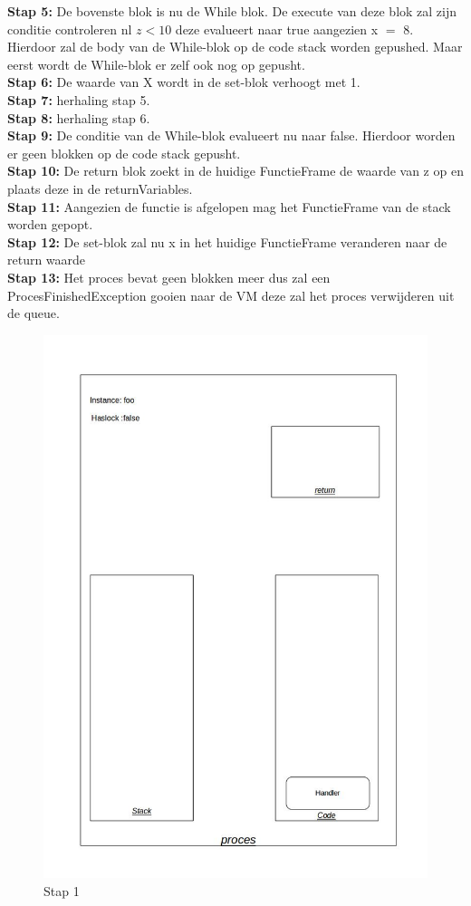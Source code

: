 \documentclass[]{article}
\begin{document}
\textbf{Stap 5:} De bovenste blok is nu de While blok. De execute van deze blok zal zijn conditie controleren nl $z < 10$ deze evalueert naar true aangezien x $=$ 8. Hierdoor zal de body van de While-blok op de code stack worden gepushed. Maar eerst wordt de While-blok er zelf ook nog op gepusht.\\
\textbf{Stap 6:} De waarde van X wordt in de set-blok verhoogt met 1.\\
\textbf{Stap 7:} herhaling stap 5.\\
\textbf{Stap 8:} herhaling stap 6.\\
\textbf{Stap 9:} De conditie van de While-blok evalueert nu naar false. Hierdoor worden er geen blokken op de code stack gepusht.\\
\textbf{Stap 10:} De return blok zoekt in de huidige FunctieFrame de waarde van z op en plaats deze in de returnVariables.\\
\textbf{Stap 11:} Aangezien de functie is afgelopen mag het FunctieFrame van de stack worden gepopt.\\
\textbf{Stap 12:} De set-blok zal nu x in het huidige FunctieFrame veranderen naar de return waarde\\
\textbf{Stap 13:} Het proces bevat geen blokken meer dus zal een ProcesFinishedException gooien naar de VM deze zal het proces verwijderen uit de queue.
 
\begin{figure}[H]
\centering
\includegraphics[scale=0.4]{AnalyseADTAlgorithm/processtappen/stap1.jpg}
\caption{Stap 1}
\end{figure}
\end{document}
